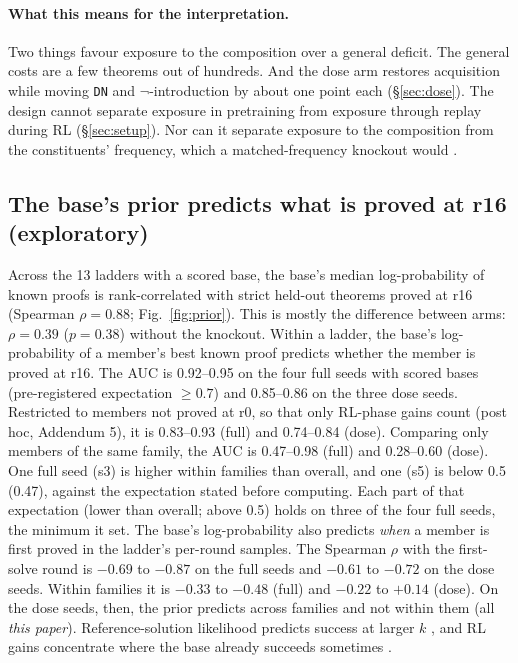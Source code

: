 \paragraph{What this means for the interpretation.} Two things favour exposure to the composition over a general
deficit. The general costs are a few theorems out of hundreds. And the dose arm restores acquisition while moving
\texttt{DN} and $\neg$-introduction by about one point each (\S\ref{sec:dose}). The design cannot separate exposure in
pretraining from exposure through replay during RL (\S\ref{sec:setup}). Nor can it separate exposure to the composition
from the constituents' frequency, which a matched-frequency knockout would \citep{abdulsalam2026rewrite,keysers2020cfq}.

\subsection{The base's prior predicts what is proved at r16 (exploratory)}
\label{sec:prior}

Across the 13 ladders with a scored base, the base's median log-probability of known \sig{} proofs is rank-correlated
with strict held-out theorems proved at r16 (Spearman $\rho = 0.88$; Fig.~\ref{fig:prior}). This is mostly the
difference between arms: $\rho = 0.39$ ($p = 0.38$) without the knockout. Within a ladder, the base's log-probability of
a member's best known proof predicts whether the member is proved at r16. The AUC is 0.92--0.95 on the four full seeds
with scored bases (pre-registered expectation $\geq 0.7$) and 0.85--0.86 on the three dose seeds. Restricted to members
not proved at r0, so that only RL-phase gains count (post hoc, Addendum 5), it is 0.83--0.93 (full) and 0.74--0.84
(dose). Comparing only members
of the same family, the AUC is 0.47--0.98 (full) and 0.28--0.60 (dose). One full seed (s3) is higher within families than
overall, and one (s5) is below 0.5 (0.47), against the expectation stated before computing. Each part of that
expectation (lower than overall; above 0.5) holds on three of the four full seeds, the minimum it set. The base's log-probability also predicts \emph{when} a member
is first proved in the ladder's per-round samples. The Spearman $\rho$ with the first-solve round is $-0.69$ to $-0.87$ on
the full seeds and $-0.61$ to $-0.72$ on the dose seeds. Within families it is $-0.33$ to $-0.48$ (full) and $-0.22$ to
$+0.14$ (dose). On the dose seeds, then, the prior predicts across families and not within them (all \emph{this paper}).
Reference-solution likelihood predicts success at larger $k$ \citep{schaeffer2025generative}, and RL gains concentrate
where the base already succeeds sometimes \citep{zhang2025interplay}.

